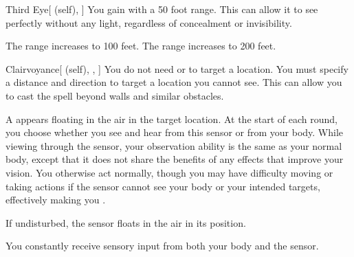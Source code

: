 \lowercase{\hypertarget{spell:Third Eye}{}}\label{spell:Third Eye}
\begin{attuneability}[Rank 4]{\hypertarget{spell:Third Eye}{Third Eye}}[ (self), ]
You gain  with a 50 foot range.
This can allow it to see perfectly without any light, regardless of concealment or invisibility.

\rankline
{} The range increases to 100 feet.
 The range increases to 200 feet.
\end{attuneability}
\vspace{0.25em}



\lowercase{\hypertarget{spell:Clairvoyance}{}}\label{spell:Clairvoyance}
\begin{attuneability}[Rank 5]{\hypertarget{spell:Clairvoyance}{Clairvoyance}}[ (self), , ]
You do not need  or  to target a location.
You must specify a distance and direction to target a location you cannot see.
This can allow you to cast the spell beyond walls and similar obstacles.

A  appears floating in the air in the target location.
At the start of each round, you choose whether you see and hear from this sensor or from your body.
While viewing through the sensor, your observation ability is the same as your normal body, except that it does not share the benefits of any  effects that improve your vision.
You otherwise act normally, though you may have difficulty moving or taking actions if the sensor cannot see your body or your intended targets, effectively making you \blinded.

If undisturbed, the sensor floats in the air in its position.

\rankline
{} You constantly receive sensory input from both your body and the sensor.

\end{attuneability}
\vspace{0.25em}



